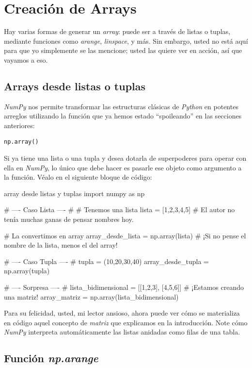 \section{Creación de Arrays}

Hay varias formas de generar un \textit{array}: puede ser a través de listas o tuplas, mediante funciones como \textit{arange}, \textit{linspace}, y más. Sin embargo, usted no está aquí para que yo simplemente se las mencione; usted las quiere ver en acción, así que vayamos a eso.

\subsection{Arrays desde listas o tuplas}

\textit{NumPy} nos permite transformar las estructuras clásicas de \textit{Python} en potentes arreglos utilizando la función que ya hemos estado ``spoileando'' en las secciones anteriores:

\begin{verbatim}
np.array()
\end{verbatim}

Si ya tiene una lista o una tupla y desea dotarla de superpoderes para operar con ella en \textit{NumPy}, lo único que debe hacer es pasarle ese objeto como argumento a la función. Véalo en el siguiente bloque de código:

\begin{pycode}{array desde listas y tuplas}
import numpy as np

# ---- Caso Lista ---- #
# Tenemos una lista
lista = [1,2,3,4,5] # El autor no tenía muchas ganas de pensar nombres hoy.

# La convertimos en array 
array_desde_lista = np.array(lista) # ¡Si no pense el nombre de la lista, menos el del array!

# ---- Caso Tupla ---- #
tupla = (10,20,30,40)
array_desde_tupla = np.array(tupla)

# ---- Sorpresa ---- #
lista_bidimensional = [[1,2,3], [4,5,6]] # ¡Estamos creando una matriz!
array_matriz = np.array(lista_bidimensional)
\end{pycode}

Para su felicidad, usted, mi lector ansioso, ahora puede ver cómo se materializa en código aquel concepto de \textit{matriz} que explicamos en la introducción. Note cómo \textit{NumPy} interpreta automáticamente las listas anidadas como filas de una tabla.

\subsection{Función \textit{np.arange}}

